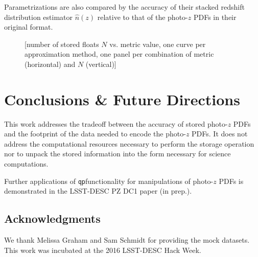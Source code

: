 \documentclass[\docopts]{\docclass}
\newcommand{\qp}{\texttt{qp}}
\begin{document}
Parametrizations are also compared by the accuracy of their stacked redshift 
distribution estimator $\hat{n}(z)$ relative to that of the photo-$z$ PDFs in 
their original format.

\begin{figure}
  \caption{[number of stored floats $N$ vs. metric value, one curve per 
approximation method, one panel per combination of metric (horizontal) and $N$ 
(vertical)]
  \label{fig:stacked}}
\end{figure}





\section{Conclusions \& Future Directions}
\label{sec:conclusions}



This work addresses the tradeoff between the accuracy of stored photo-$z$ PDFs 
and the footprint of the data needed to encode the photo-$z$ PDFs.  It does not 
address the computational resources necessary to perform the storage operation 
nor to unpack the stored information into the form necessary for science 
computations.

Further applications of \qp functionality for manipulations of photo-$z$ PDFs 
is demonstrated in the LSST-DESC PZ DC1 paper (in prep.).

\subsection*{Acknowledgments}


We thank Melissa Graham and Sam Schmidt for providing the mock datasets.  This 
work was incubated at the 2016 LSST-DESC Hack Week.







\end{document}
